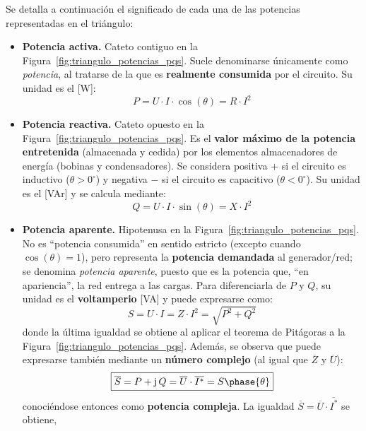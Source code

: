 Se detalla a continuación el significado de cada una de las potencias
representadas en el triángulo:
\begin{itemize}
\item \textbf{Potencia activa.} Cateto contiguo en la
  Figura~\ref{fig:triangulo_potencias_pqs}. Suele denominarse
  únicamente como \textit{potencia}, al tratarse de la que es
  \textbf{realmente consumida} por el circuito. Su unidad es el [W]:
  \begin{equation}\label{eq:Pactiva}
    \boxed{P = U\cdot I\cdot\cos(\theta) = R \cdot I^2}
  \end{equation}
\item \textbf{Potencia reactiva.} Cateto opuesto en la
  Figura~\ref{fig:triangulo_potencias_pqs}. Es el \textbf{valor máximo
    de la potencia entretenida} (almacenada y cedida) por los
  elementos almacenadores de energía (bobinas y condensadores). Se
  considera positiva $+$ si el circuito es inductivo
  ($\theta>0^\circ$) y negativa $-$ si el circuito es capacitivo
  ($\theta<0^\circ$). Su unidad es el [VAr] y se calcula mediante:
  \begin{equation}\label{eq:Qreactiva}
    \boxed{Q = U\cdot I\cdot\sin(\theta) = X \cdot I^2}
  \end{equation}
\item \textbf{Potencia aparente.} Hipotenusa en la
  Figura~\ref{fig:triangulo_potencias_pqs}. No es ``potencia
  consumida'' en sentido estricto (excepto cuando $\cos(\theta)=1$),
  pero representa la \textbf{potencia demandada} al generador/red; se
  denomina \textit{potencia aparente}, puesto que es la potencia que,
  ``en apariencia'', la red entrega a las cargas. Para diferenciarla
  de $P$ y $Q$, su unidad es el \textbf{voltamperio} [VA] y puede
  expresarse como:
  \begin{equation}\label{eq:Saparente}
    \boxed{S = U\cdot I= Z \cdot I^2=\sqrt{P^2+Q^2}}
  \end{equation}
  donde la última igualdad se obtiene al aplicar el teorema de
  Pitágoras a la Figura~\ref{fig:triangulo_potencias_pqs}. Además, se
  observa que puede expresarse también mediante un \textbf{número
    complejo} (al igual que $\overline{Z}$ y $\overline{U}$):
  \begin{equation}
    \boxed{\overline{S}=P+\mathrm{j}\,Q=\overline{U}\cdot \overline{I^*}=S\phase{\theta}}
  \end{equation}
  conociéndose entonces como \textbf{potencia compleja}. La igualdad
  $\overline{S}=\overline{U}\cdot \overline{I^*}$ se obtiene,

\end{itemize}
